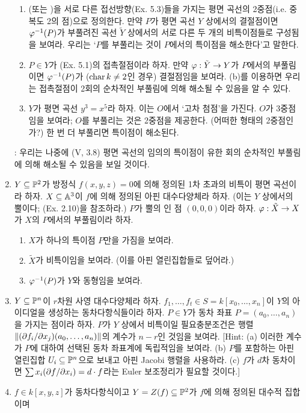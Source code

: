 \begin{enumerate}[label=\tb{5.\arabic*.},itemindent=0mm,itemsep=2mm]
\begin{enumerate}[label=(\alph*)]
	\item {}(또는 )을 서로 다른 접선방향(Ex. 5.3)들을 가지는
	평면 곡선의 2중점(i.e. 중복도 2의 점)으로 정의한다.
	만약 $P$가 평면 곡선 $Y$ 상에서의 결절점이면 $\varphi^{-1}(P)$가 부풀려진 곡선 $\tilde Y$ 상에서의
	서로 다른 두 개의 비특이점들로 구성됨을 보여라. 우리는 `$P$를 부풀리는 것이 $P$에서의 특이점을 해소한다'고 말한다.
	\item $P\in Y$가 (Ex. 5.1)의 접촉절점이라 하자.
	만약 $\varphi:\tilde Y\rightarrow Y$가 $P$에서의 부풀림이면 $\varphi^{-1}(P)$가 ($\operatorname{char} k\ne 2$인 경우) 결절점임을 보여라.
	(b)를 이용하면 우리는 접촉절점이 2회의 순차적인 부풀림에 의해 해소될 수 있음을 알 수 있다.
	\item $Y$가 평면 곡선 $y^3=x^5$라 하자. 이는 $O$에서 `고차 첨점'을 가진다.
	$O$가 3중점임을 보여라; $O$를 부풀리는 것은 2중점을 제공한다. (어떠한 형태의 2중점인가?) 한 번 더 부풀리면 특이점이 해소된다.
	\end{enumerate}
	: 우리는 나중에 (V, 3.8) 평면 곡선의 임의의 특이점이 유한 회의 순차적인 부풀림에 의해 해소될 수 있음을 보일 것이다.
	\item $Y\subseteq\mathbb{P}^2$가 방정식 $f(x,y,z)=0$에 의해 정의된 1차 초과의 비특이 평면 곡선이라 하자.
	$X\subseteq\mathbb{A}^3$이 $f$에 의해 정의된 아핀 대수다양체라 하자. (이는 $Y$ 상에서의 뿔이다; (Ex. 2.10)을 참조하라.)
	$P$가 뿔의 인 점 $(0,0,0)$이라 하자. $\varphi:\tilde X\rightarrow X$가 $X$의 $P$에서의 부풀림이라 하자.
	\begin{enumerate}[label=(\alph*)]
	\item $X$가 하나의 특이점 $P$만을 가짐을 보여라.
	\item $\tilde X$가 비특이임을 보여라. (이를 아핀 열린집합들로 덮어라.)
	\item $\varphi^{-1}(P)$가 $Y$와 동형임을 보여라.
	\end{enumerate}
	\item $Y\subseteq\mathbb{P}^n$이 $r$차원 사영 대수다양체라 하자.
	$f_1,\ldots,f_t\in S=k[x_0,\ldots,x_n]$이 $Y$의 아이디얼을 생성하는 동차다항식들이라 하자.
	$P\in Y$가 동차 좌표 $P=(a_0,\ldots,a_n)$을 가지는 점이라 하자.
	$P$가 $Y$ 상에서 비특이일 필요충분조건은 행렬 $\|(\partial f_i/\partial x_j)(a_0,\ldots,a_n)\|$의 계수가 $n-r$인 것임을 보여라.
	[Hint: (a) 이러한 계수가 $P$에 대하여 선택된 동차 좌표계에 독립적임을 보여라.
	(b) $P$를 포함하는 아핀 열린집합 $U_i\subseteq\mathbb{P}^n$으로 보내고 아핀 Jacobi 행렬을 사용하라.
	(c) $f$가 $d$차 동차이면 $\sum x_i(\partial f/\partial x_i)=d\cdot f$라는 Euler 보조정리가 필요할 것이다.]
	\item $f\in k[x,y,z]$가 동차다항식이고 $Y=Z(f)\subseteq\mathbb{P}^2$가 $f$에 의해 정의된 대수적 집합이며

\end{enumerate}
